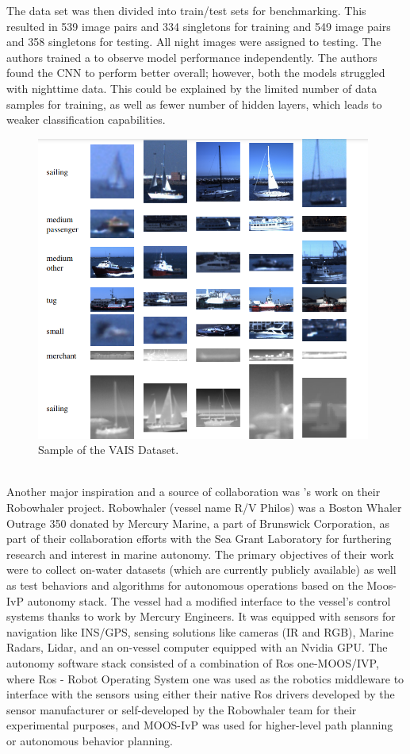 The data set was then divided into train/test sets for benchmarking. This resulted in 539 image pairs and 334 singletons for training and 549 image pairs and 358 singletons for testing. All night images were assigned to testing. The authors trained a to observe model performance independently. The authors found the CNN to perform better overall; however, both the models struggled with nighttime data. This could be explained by the limited number of data samples for training, as well as fewer number of hidden layers, which leads to weaker classification capabilities. 
\begin{figure}[H]
    \centering
    \includegraphics[width=\textwidth,height=10cm,keepaspectratio=true]{src/Images/vais_data.PNG}
    \caption{
     Sample of the VAIS Dataset. \cite{Zhang_2015_CVPR_Workshops}
     }
\end{figure}
\\

Another major inspiration and a source of collaboration was \cite{defilippo2021robowhaler}'s work on their Robowhaler project. Robowhaler (vessel name R/V Philos) was a Boston Whaler Outrage 350 donated by Mercury Marine, a part of Brunswick Corporation, as part of their collaboration efforts with the Sea Grant Laboratory for furthering research and interest in marine autonomy. The primary objectives of their work were to collect on-water datasets (which are currently publicly available) as well as test behaviors and algorithms for autonomous operations based on the Moos-IvP autonomy stack\cite{benjamin2009overview}. The vessel had a modified interface to the vessel's control systems thanks to work by Mercury Engineers. It was equipped with sensors for navigation like INS/GPS, sensing solutions like cameras (IR and RGB), Marine Radars, Lidar, and an on-vessel computer equipped with an Nvidia GPU. The autonomy software stack consisted of a combination of Ros one-MOOS/IVP, where Ros - Robot Operating System\cite{ros} one was used as the robotics middleware to interface with the sensors using either their native Ros drivers developed by the sensor manufacturer or self-developed by the Robowhaler team for their experimental purposes, and MOOS-IvP\cite{ivp_stack} was used for higher-level path planning or autonomous behavior planning. 
\\

